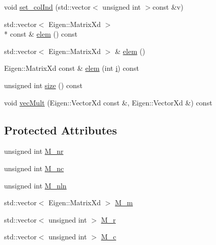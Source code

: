 \begin{DoxyCompactItemize}
\item 
void \hyperlink{classTspeed_1_1BaseMat_ac26f40dd7c982e596214df26e4d70931}{set\-\_\-col\-Ind} (std\-::vector$<$ unsigned int $>$const \&v)
\item 
std\-::vector$<$ Eigen\-::\-Matrix\-Xd $>$\\*
 const \& \hyperlink{classTspeed_1_1BaseMat_a71819b73e763c000d5ec02546f81c16f}{elem} () const 
\item 
std\-::vector$<$ Eigen\-::\-Matrix\-Xd $>$ \& \hyperlink{classTspeed_1_1BaseMat_af29296b4ded5241e8813d40a0a032856}{elem} ()
\item 
Eigen\-::\-Matrix\-Xd const \& \hyperlink{classTspeed_1_1BaseMat_abce23dbc10f2dea5894cf72ac6daee75}{elem} (int \hyperlink{vtk__vector__out_8m_a6f6ccfcf58b31cb6412107d9d5281426}{i}) const 
\item 
unsigned int \hyperlink{classTspeed_1_1BaseMat_ad7ab902ff362d6a356fdde29ae39e9db}{size} () const 
\item 
void \hyperlink{classTspeed_1_1BaseMat_a8fdb94992f87a903132a7c1848221d4f}{vec\-Mult} (Eigen\-::\-Vector\-Xd const \&, Eigen\-::\-Vector\-Xd \&) const 
\end{DoxyCompactItemize}
\subsection*{Protected Attributes}
\begin{DoxyCompactItemize}
\item 
unsigned int \hyperlink{classTspeed_1_1BaseMat_a2122ee11f990f68aadf6046e7c02aa01}{M\-\_\-nr}
\item 
unsigned int \hyperlink{classTspeed_1_1BaseMat_aaeeb3b9b5163d2ad7213877c6d9d3a48}{M\-\_\-nc}
\item 
unsigned int \hyperlink{classTspeed_1_1BaseMat_a6a75298d3c989a182f972916f894df47}{M\-\_\-nln}
\item 
std\-::vector$<$ Eigen\-::\-Matrix\-Xd $>$ \hyperlink{classTspeed_1_1BaseMat_a4020a63099be7634e355b66c21a37bc0}{M\-\_\-m}
\item 
std\-::vector$<$ unsigned int $>$ \hyperlink{classTspeed_1_1BaseMat_a8147ef48c03cd2080c35e35c213c21aa}{M\-\_\-r}
\item 
std\-::vector$<$ unsigned int $>$ \hyperlink{classTspeed_1_1BaseMat_a0c1966f176c1bf095decc0f40fd2397f}{M\-\_\-c}
\end{DoxyCompactItemize}


